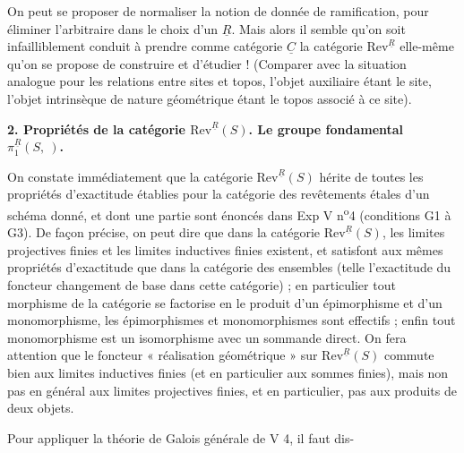 \documentclass[11pt,a4paper]{article}
\begin{document}
On peut se proposer de normaliser la notion de donnée de ramification, pour
éliminer l'arbitraire dans le choix d'un $\underline{R}$. Mais alors il semble
qu'on soit infailliblement conduit à prendre comme catégorie $\underline{C}$ la
catégorie $\mathrm{Rev}^{\underline{R}}$ elle-même qu'on se propose de
construire et d'étudier ! (Comparer avec la situation analogue pour les
relations entre sites et topos, l'objet auxiliaire étant le site, l'objet
intrinsèque de nature géométrique étant le topos associé à ce site).

\textbf{2. Propriétés de la catégorie $\mathrm{Rev}^{\underline{R}}(S)$. Le
groupe fondamental $\pi_1^{\underline{R}}(S,\ )$.}

On constate immédiatement que la catégorie $\mathrm{Rev}^{\underline{R}}(S)$
hérite de toutes les propriétés d'exactitude \struck{\ill{}} établies pour la
catégorie des revêtements étales d'un schéma donné, et dont une partie sont
énoncés dans Exp V n\textsuperscript{o}4 (conditions G1 à G3). De façon
précise, on peut dire que dans la catégorie $\mathrm{Rev}^{\underline{R}}(S)$,
les limites projectives finies et les limites inductives finies existent, et
satisfont aux mêmes propriétés d'exactitude que dans la catégorie des ensembles
(telle l'exactitude du foncteur changement de base dans cette catégorie) ; en
particulier tout morphisme de la catégorie se factorise en le produit d'un
épimorphisme et d'un monomorphisme, les épimorphismes et monomorphismes sont
\struck{\ill{}} effectifs ; enfin tout monomorphisme est un isomorphisme avec
un sommande direct. On fera attention que le foncteur « réalisation
géométrique » sur $\mathrm{Rev}^{\underline{R}}(S)$ commute bien aux limites
inductives finies (et \struck{\ill{}} en particulier aux sommes finies), mais
non pas en général aux limites projectives finies, et en particulier, pas aux
produits de deux objets.

Pour appliquer la théorie de Galois générale de V 4, il faut dis-
\end{document}
